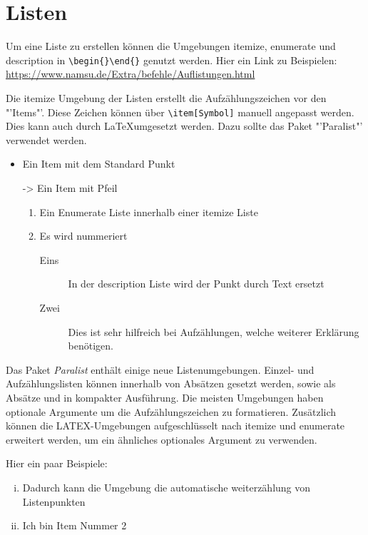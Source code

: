 \chapter{Listen}

Um eine Liste zu erstellen können die Umgebungen itemize, enumerate und description in \verb|\begin{}\end{}| genutzt werden. Hier ein Link zu Beispielen: \url{https://www.namsu.de/Extra/befehle/Auflistungen.html} \newline

Die itemize Umgebung der Listen erstellt die Aufzählungszeichen vor den "'Items"'. Diese Zeichen können über \verb|\item[Symbol]| manuell angepasst werden. Dies kann auch durch \LaTeX umgesetzt werden. Dazu sollte das Paket "'Paralist"' verwendet werden.  
\begin{itemize}
	\item Ein Item mit dem Standard Punkt
	\item[->] Ein Item mit Pfeil
	\begin{enumerate}
		\item Ein Enumerate Liste innerhalb einer itemize Liste
		\item Es wird nummeriert
		\begin{description}
			\item[Eins] In der description Liste wird der Punkt durch Text ersetzt
			\item[Zwei] Dies ist sehr hilfreich bei Aufzählungen, welche weiterer Erklärung benötigen.
		\end{description}
	\end{enumerate}
\end{itemize}

Das Paket \emph{Paralist} enthält einige neue Listenumgebungen. Einzel- und
Aufzählungslisten können innerhalb von Absätzen gesetzt werden, sowie als Absätze und
in kompakter Ausführung. Die meisten Umgebungen haben optionale Argumente
um die Aufzählungszeichen zu formatieren. Zusätzlich können die LATEX-Umgebungen aufgeschlüsselt nach itemize und enumerate erweitert werden, um ein ähnliches optionales Argument zu verwenden. \newline

Hier ein paar Beispiele:

\begin{enumerate}[(i)]
	\item Dadurch kann die Umgebung die automatische weiterzählung von Listenpunkten
	\item Ich bin Item Nummer 2
\end{enumerate} 

